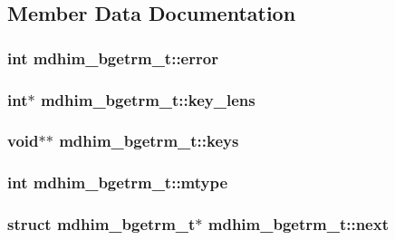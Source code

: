 \subsection{Member Data Documentation}
\hypertarget{structmdhim__bgetrm__t_a42d5a4b81bd9817f4c31348525d53e37}{
\subsubsection[{error}]{\setlength{\rightskip}{0pt plus 5cm}int mdhim\-\_\-bgetrm\-\_\-t\-::error}}\label{d0/d48/structmdhim__bgetrm__t_a42d5a4b81bd9817f4c31348525d53e37}
\hypertarget{structmdhim__bgetrm__t_a4edb37ec3da3413607e3eeda3f224525}{
\subsubsection[{key\-\_\-lens}]{\setlength{\rightskip}{0pt plus 5cm}int$\ast$ mdhim\-\_\-bgetrm\-\_\-t\-::key\-\_\-lens}}\label{d0/d48/structmdhim__bgetrm__t_a4edb37ec3da3413607e3eeda3f224525}
\hypertarget{structmdhim__bgetrm__t_adb7029ca1238649fc6b838e21dc1e1fc}{
\subsubsection[{keys}]{\setlength{\rightskip}{0pt plus 5cm}void$\ast$$\ast$ mdhim\-\_\-bgetrm\-\_\-t\-::keys}}\label{d0/d48/structmdhim__bgetrm__t_adb7029ca1238649fc6b838e21dc1e1fc}
\hypertarget{structmdhim__bgetrm__t_a6d1d78bcd4d55f5341f543246a7636c6}{
\subsubsection[{mtype}]{\setlength{\rightskip}{0pt plus 5cm}int mdhim\-\_\-bgetrm\-\_\-t\-::mtype}}\label{d0/d48/structmdhim__bgetrm__t_a6d1d78bcd4d55f5341f543246a7636c6}
\hypertarget{structmdhim__bgetrm__t_aeb24801d3c8827a0ca7611312e28e568}{
\subsubsection[{next}]{\setlength{\rightskip}{0pt plus 5cm}struct {\bf mdhim\-\_\-bgetrm\-\_\-t}$\ast$ mdhim\-\_\-bgetrm\-\_\-t\-::next}}\label{d0/d48/structmdhim__bgetrm__t_aeb24801d3c8827a0ca7611312e28e568}
